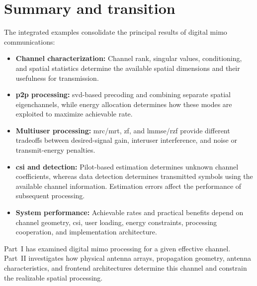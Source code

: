 
\clearpage
\section*{Summary and transition}

The integrated examples consolidate the principal results of digital \ac{mimo} communications:

\begin{itemize}
	\item \textbf{Channel characterization:} Channel rank, singular values, conditioning, and spatial statistics determine the available spatial dimensions and their usefulness for transmission.
	
	\item \textbf{\ac{p2p} processing:} \ac{svd}-based precoding and combining separate spatial eigenchannels, while energy allocation determines how these modes are exploited to maximize achievable rate.
	
	\item \textbf{Multiuser processing:} \ac{mrc}/\ac{mrt}, \ac{zf}, and \ac{lmmse}/\ac{rzf} provide different tradeoffs between desired-signal gain, interuser interference, and noise or transmit-energy penalties.
	
	\item \textbf{\ac{csi} and detection:} Pilot-based estimation determines unknown channel coefficients, whereas data detection determines transmitted symbols using the available channel information. Estimation errors affect the performance of subsequent processing.
	
	\item \textbf{System performance:} Achievable rates and practical benefits depend on channel geometry, \ac{csi}, user loading, energy constraints, processing cooperation, and implementation architecture.
\end{itemize}

Part~I has examined digital \ac{mimo} processing for a given effective channel. Part~II investigates how physical antenna arrays, propagation geometry, antenna characteristics, and frontend architectures determine this channel and constrain the realizable spatial processing.




